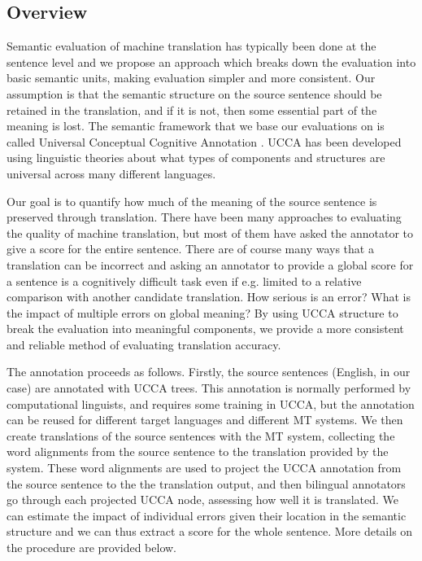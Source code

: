 \documentclass[11pt]{article}
\begin{document}
\subsection{Overview}

Semantic evaluation of machine translation has typically been done at the sentence level and
we propose an  approach which breaks down the evaluation into basic semantic units, making evaluation 
simpler and more consistent. 
Our  assumption is that the semantic structure on the source sentence should be 
retained in the translation, and if it is not, then some essential part of the meaning 
is
lost. 
The semantic framework that we base our evaluations on is called 
Universal Conceptual Cognitive Annotation .  
UCCA has been developed using linguistic theories about 
what types of components and structures are universal across many different languages.

Our goal is to quantify how much of the meaning of the source sentence is preserved through translation.
There have been many approaches to evaluating the quality of machine translation, but most of them
have asked the annotator to give a score for the entire sentence. There are of course many ways 
that a translation can be incorrect and asking an annotator to provide a global score for a sentence
is a cognitively difficult task even if e.g. limited to a relative comparison
with another candidate translation. How serious is an error? What is the impact of multiple errors on global meaning?
By using UCCA structure to break the evaluation into meaningful components, we provide 
a more consistent and reliable method of evaluating translation accuracy.

The annotation proceeds as follows. Firstly, the source sentences (English, in our case) are annotated with UCCA trees. This
annotation is normally performed by computational linguists, and requires some training in UCCA, but the annotation can be 
reused for different target languages and different MT systems. 
We then create translations of the source sentences with the
MT system, collecting the word alignments from 
%
the
source sentence to 
the
translation provided by the system. These word
alignments are used to project the UCCA annotation from the source sentence to the the translation output, and then bilingual
annotators go through each projected UCCA node, assessing how well it is translated.  
We can estimate the impact of individual errors given their location in the semantic structure 
and we can thus extract a score for the whole sentence. More details on the procedure are provided 
below.
\end{document}
